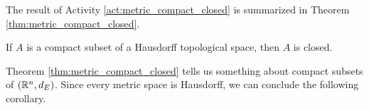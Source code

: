 \begin{comment}

\ActivitySolution

\ba
\item To show that $A$ is closed, we need to show that $X \setminus A$ is open. To show that $X \setminus A$ is open, we can demonstrate that $X \setminus A$ is a neighborhood of each of its points.

\item Since $\emptyset$ is always closed, if $A = \emptyset$ we are done. So we can assume that $A \neq \emptyset$. Let $x \in X \setminus A$. Since $X$ is Hausdorff, we can separate points by disjoint open sets. So for each $a \in A$, there exist disjoint open sets $O_{xa}$ and $O_a$ with $x \in O_{xa}$ and $a \in O_a$. 

\item The collection $\{O_a \mid a \in A\}$ is an open cover of $A$. The fact that $A$ is compact means that there is a finite subcover for this cover. That is, there exist a positive integer $n$ and elements $a_1$, $a_2$, $\ldots$, $a_n$ in $A$ such that the sets $O_{a_1}$, $O_{a_2}$, $\ldots$, $O_{a_n}$ form an open cover of $A$.

\item Let $O = \bigcap_{k=1}^n O_{xa_k}$. Note that if $a \in A$, then $a \in O_{a_k}$ for some $k$. But $O_{xa_k} \cap O_{a_k} = \emptyset$, so $a \notin O_{xa_k}$. Since $O \subseteq O_{xa_k}$, it is the case that $a \notin O$. Thus, $O \cap A = \emptyset$ and $O \subseteq X \setminus A$. We know that $x \in O_{xa_k}$ for every $k$, so $x \in O$. A finite union of open sets is open, so $O$ is open. This means that $X \setminus A$ is a neighborhood of each of its points and is therefore open. So $A$ is closed. 

\ea

\end{comment}


The result of Activity \ref{act:metric_compact_closed} is summarized in Theorem \ref{thm:metric_compact_closed}.

\begin{theorem} \label{thm:metric_compact_closed} If $A$ is a compact subset of a Hausdorff topological space, then $A$ is closed. 
\end{theorem}

Theorem \ref{thm:metric_compact_closed} tells us something about compact subsets of $(\mathbb{R}^n, d_E)$. Since every metric space is Hausdorff, we can conclude the following corollary.

